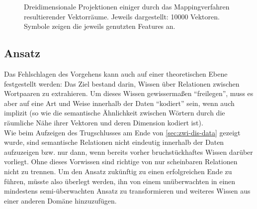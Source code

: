 \begin{itemize}
\begin{figure}[h]
  \flushleft
  \caption[Dreidimensionale Projektionen einiger durch das Mappingverfahren resultierender Vektorräume]{Dreidimensionale
   Projektionen einiger durch das Mappingverfahren resultierender Vektorräume. Jeweils dargestellt: 10000 Vektoren.
   Symbole zeigen die jeweils genutzten Features an. \label{fig:proj_map}}
\end{figure}

\end{itemize}

\subsection{Ansatz}

Das Fehlschlagen des Vorgehens kann auch auf einer theoretischen Ebene festgestellt werden: Das Ziel bestand darin, Wissen
über Relationen zwischen Wortpaaren zu extrahieren. Um dieses Wissen gewissermaßen ``freilegen'', muss es aber auf eine
Art und Weise innerhalb der Daten ``kodiert'' sein, wenn auch implizit (so wie die semantische Ähnlichkeit zwischen Wörtern
durch die räumliche Nähe ihrer Vektoren und deren Dimension kodiert ist).\\
Wie beim Aufzeigen des Trugschlusses am Ende von \ref{sec:zwi-dis-data} gezeigt wurde, sind semantische Relationen nicht eindeutig
innerhalb der Daten aufzuzeigen bzw. nur dann, wenn bereits vorher bruchstückhaftes Wissen darüber vorliegt. Ohne
dieses Vorwissen sind richtige von nur scheinbaren Relationen nicht zu trennen. Um den Ansatz zukünftig zu einen erfolgreichen
Ende zu führen, müsste also überlegt werden, ihn von einem unüberwachten in einen mindestens semi-überwachten Ansatz zu
transformieren und weiteres Wissen aus einer anderen Domäne hinzuzufügen.
